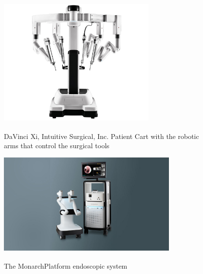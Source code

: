 \begin{center}
\begin{figure}[htbp]
\centering
\includegraphics[width=0.7\textwidth]{images/intuitive-da-vinci-xi-patient-cart-front-view-1060867-lo-res.jpg}\\
\caption{DaVinci Xi, \textsuperscript {} Intuitive Surgical, Inc. Patient Cart with the robotic arms that control the surgical tools}
\end{figure}
\end{center}

\begin{center}
\begin{figure}[htbp]
\centering
\includegraphics[width=0.8\textwidth]{images/Moarch_Platform_1200_x_676_1_.jpg}\\
\caption[The Monarch\textsuperscript \texttrademark Platform endoscopic system]{The Monarch\textsuperscript \texttrademark Platform endoscopic system \footnotemark}
\end{figure}
\end{center}


